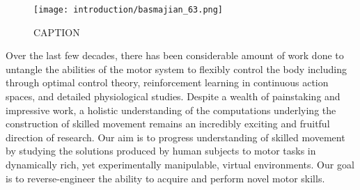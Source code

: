 \documentclass[../main.tex]{subfiles}
\begin{document}


\begin{figure}
  \centering
  \texttt{[image: introduction/basmajian\_63.png]}
  \caption[Basmajian experimental method]{CAPTION}\label{fig:basmajian_63}
\end{figure}

Over the last few decades, there has been considerable amount of work done to untangle the abilities of the motor system to flexibly control the body including through optimal control theory\cite{Todorov2004}, reinforcement learning in continuous action spaces\cite{koberReinforcementLearningRobotics2013}, and detailed physiological studies\cite{sauerbreiCorticalPatternGeneration2019}. Despite a wealth of painstaking and impressive work, a holistic understanding of the computations underlying the construction of skilled movement remains an incredibly exciting and fruitful direction of research. Our aim is to progress understanding of skilled movement by studying the solutions produced by human subjects to motor tasks in dynamically rich, yet experimentally manipulable, virtual environments. Our goal is to reverse-engineer the ability to acquire and perform novel motor skills.
\end{document}
